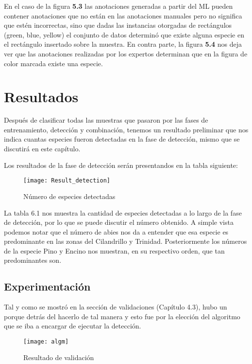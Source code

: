 En el caso de la figura \textbf{5.3} las anotaciones generadas a partir del ML pueden contener anotaciones que no están en las anotaciones manuales pero no significa que estén incorrectas, sino que dadas las instancias otorgadas de rectángulos (green, blue, yellow) el conjunto de datos determinó que existe alguna especie en el rectángulo insertado sobre la muestra. En contra parte, la figura \textbf{5.4} nos deja ver que las anotaciones realizadas por los expertos determinan que en la figura de color marcada existe una especie.

\break

\chapter{Resultados}
Después de clasificar todas las muestras que pasaron por las fases de entrenamiento, detección y combinación, tenemos un resultado preliminar que nos indica cuantas especies fueron detectadas en la fase de detección, mismo que se discutirá en este capítulo.


Los resultados de la fase de detección serán presentandos en la tabla siguiente:

\begin{figure}[H]
  \centering
  \begin{minipage}[b]{0.5\textwidth}
        \texttt{[image: Result\_detection]}
    \caption{Número de especies detectadas}
  \end{minipage}
\end{figure}

La tabla 6.1 nos muestra la cantidad de especies detectadas a lo largo de la fase de detección, por lo que se puede discutir el número obtenido. A simple vista podemos notar que el número de abies nos da a entender que esa especie es predominante en las zonas del Cilandrillo y Trinidad. Posteriormente los números de la especie Pino y Encino nos muestran, en su respectivo orden, que tan predominantes son.

\section{Experimentación}
Tal y como se mostró en la sección de validaciones (Capítulo 4.3), hubo un porque detrás del hacerlo de tal manera y esto fue por la elección del algoritmo que se iba a encargar de ejecutar la detección.


\begin{figure}[H]
  \centering
  \begin{minipage}[b]{0.8\textwidth}
        \texttt{[image: algm]}
    \caption{Resultado de validación}
  \end{minipage}
\end{figure}



